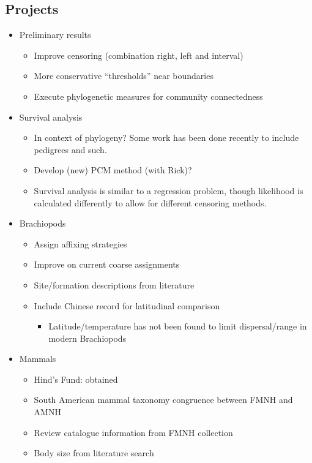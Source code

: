 \documentclass[12pt,letterpaper]{article}
\begin{document}
\subsection{Projects}
\begin{itemize}
  \item Preliminary results
    \begin{itemize}
      \item Improve censoring (combination right, left and interval)
      \item More conservative ``thresholds'' near boundaries
      \item Execute phylogenetic measures for community connectedness
    \end{itemize}
  \item Survival analysis
    \begin{itemize}
      \item In context of phylogeny? Some work has been done recently to include pedigrees and such. 
      \item Develop (new) PCM method (with Rick)?
      \item Survival analysis is similar to a regression problem, though likelihood is calculated differently to allow for different censoring methods.
    \end{itemize}
  \item Brachiopods
    \begin{itemize}
      \item Assign affixing strategies
      \item Improve on current coarse assignments
      \item Site/formation descriptions from literature
      \item Include Chinese record for latitudinal comparison
        \begin{itemize}
          \item Latitude/temperature has not been found to limit dispersal/range in modern Brachiopods
        \end{itemize}
    \end{itemize}
  \item Mammals
    \begin{itemize}
      \item Hind's Fund: obtained
      \item South American mammal taxonomy congruence between FMNH and AMNH
      \item Review catalogue information from FMNH collection
      \item Body size from literature search
    \end{itemize}
\end{itemize}
\end{document}
